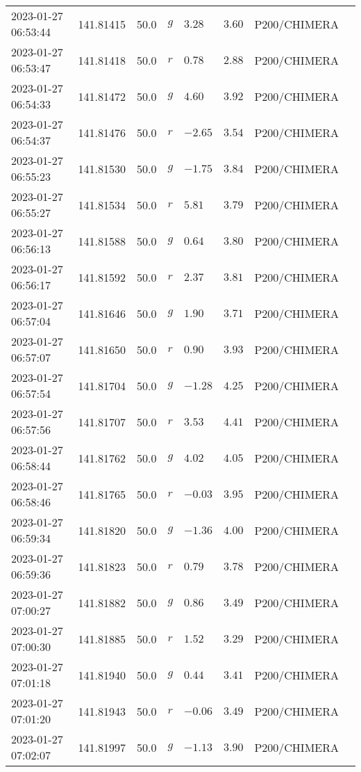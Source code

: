 \documentclass{nature_plusfigure}
\begin{document}
\begin{supplement}
\begin{center}
\begin{longtable}{llllllll}
2023-01-27 06:53:44 & 141.81415 & 50.0 & $g$ & $3.28$ & $3.60$ & P200/CHIMERA &  \\ 
2023-01-27 06:53:47 & 141.81418 & 50.0 & $r$ & $0.78$ & $2.88$ & P200/CHIMERA &  \\ 
2023-01-27 06:54:33 & 141.81472 & 50.0 & $g$ & $4.60$ & $3.92$ & P200/CHIMERA &  \\ 
2023-01-27 06:54:37 & 141.81476 & 50.0 & $r$ & $-2.65$ & $3.54$ & P200/CHIMERA &  \\ 
2023-01-27 06:55:23 & 141.81530 & 50.0 & $g$ & $-1.75$ & $3.84$ & P200/CHIMERA &  \\ 
2023-01-27 06:55:27 & 141.81534 & 50.0 & $r$ & $5.81$ & $3.79$ & P200/CHIMERA &  \\ 
2023-01-27 06:56:13 & 141.81588 & 50.0 & $g$ & $0.64$ & $3.80$ & P200/CHIMERA &  \\ 
2023-01-27 06:56:17 & 141.81592 & 50.0 & $r$ & $2.37$ & $3.81$ & P200/CHIMERA &  \\ 
2023-01-27 06:57:04 & 141.81646 & 50.0 & $g$ & $1.90$ & $3.71$ & P200/CHIMERA &  \\ 
2023-01-27 06:57:07 & 141.81650 & 50.0 & $r$ & $0.90$ & $3.93$ & P200/CHIMERA &  \\ 
2023-01-27 06:57:54 & 141.81704 & 50.0 & $g$ & $-1.28$ & $4.25$ & P200/CHIMERA &  \\ 
2023-01-27 06:57:56 & 141.81707 & 50.0 & $r$ & $3.53$ & $4.41$ & P200/CHIMERA &  \\ 
2023-01-27 06:58:44 & 141.81762 & 50.0 & $g$ & $4.02$ & $4.05$ & P200/CHIMERA &  \\ 
2023-01-27 06:58:46 & 141.81765 & 50.0 & $r$ & $-0.03$ & $3.95$ & P200/CHIMERA &  \\ 
2023-01-27 06:59:34 & 141.81820 & 50.0 & $g$ & $-1.36$ & $4.00$ & P200/CHIMERA &  \\ 
2023-01-27 06:59:36 & 141.81823 & 50.0 & $r$ & $0.79$ & $3.78$ & P200/CHIMERA &  \\ 
2023-01-27 07:00:27 & 141.81882 & 50.0 & $g$ & $0.86$ & $3.49$ & P200/CHIMERA &  \\ 
2023-01-27 07:00:30 & 141.81885 & 50.0 & $r$ & $1.52$ & $3.29$ & P200/CHIMERA &  \\ 
2023-01-27 07:01:18 & 141.81940 & 50.0 & $g$ & $0.44$ & $3.41$ & P200/CHIMERA &  \\ 
2023-01-27 07:01:20 & 141.81943 & 50.0 & $r$ & $-0.06$ & $3.49$ & P200/CHIMERA &  \\ 
2023-01-27 07:02:07 & 141.81997 & 50.0 & $g$ & $-1.13$ & $3.90$ & P200/CHIMERA &  \\ 

\end{longtable}
\end{center}
\end{supplement}
\end{document}

